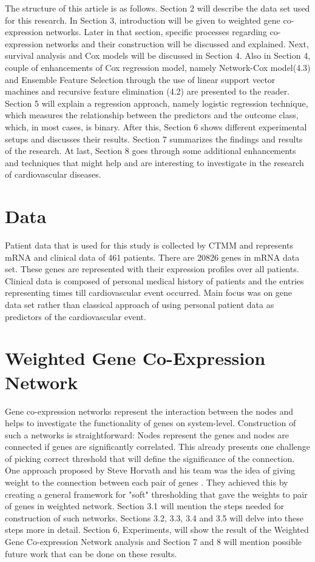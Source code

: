 \documentclass{ba-kecs}
\numberwithin{figure}{section}
\numberwithin{equation}{section}
\begin{document}
The structure of this article is as follows. Section 2 will describe the data set used for this research. In Section 3, introduction will be given to weighted gene co-expression networks. Later in that section, specific processes regarding co-expression networks and their construction will be discussed and explained. Next, survival analysis and Cox models will be discussed in Section 4. Also in Section 4, couple of enhancements of Cox regression model, namely Network-Cox model(4.3) and Ensemble Feature Selection through the use of linear support vector machines and recursive feature elimination (4.2) are presented to the reader. Section 5 will explain a regression approach, namely logistic regression technique, which measures the relationship between the predictors and the outcome class, which, in most cases, is binary.  After this, Section 6 shows different experimental setups and discusses their results. Section 7 summarizes the findings and results of the research. At last, Section 8 goes through some additional enhancements and techniques that might help and are interesting to investigate in the research of cardiovascular diseases.

\section{Data}
Patient data that is used for this study is collected by CTMM and represents mRNA and clinical data of 461 patients. There are 20826 genes in mRNA data set. These genes are represented with their expression profiles over all patients. Clinical data is composed of personal medical history of patients and the entries representing times till cardiovascular event occurred. Main focus was on gene data set rather than classical approach of using personal patient data as predictors of the cardiovascular event.

\section{Weighted Gene Co-Expression Network}
Gene co-expression networks represent the interaction between the nodes and helps to investigate the functionality of genes on system-level. Construction of such a networks is straightforward: Nodes represent the genes and nodes are connected if genes are significantly correlated. This already presents one challenge of picking correct threshold that will define the significance of the connection. One approach proposed by Steve Horvath and his team was the idea of giving weight to the connection between each pair of genes \cite{wgcna,wgcna3}. They achieved this by creating a general framework for "soft" thresholding that gave the weights to pair of genes in weighted network. Section 3.1 will mention the steps needed for construction of such networks. Sections 3.2, 3.3, 3.4 and 3.5 will delve into these steps more in detail. Section 6, Experiments, will show the result of the Weighted Gene Co-expression Network analysis and Section 7 and 8 will mention possible future work that can be done on these results.
\end{document}
